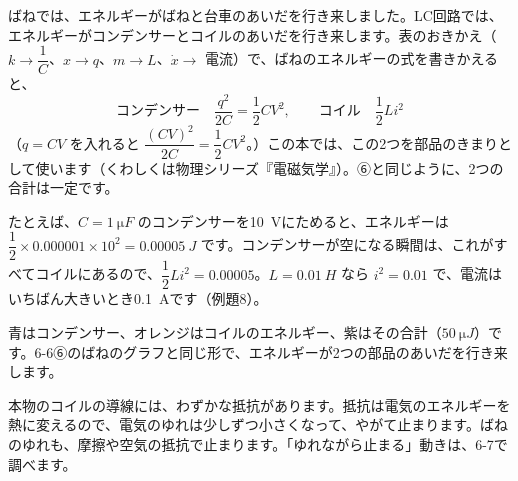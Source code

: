 ばねでは、エネルギーがばねと台車のあいだを行き来しました。LC回路では、エネルギーがコンデンサーとコイルのあいだを行き来します。表のおきかえ（$k\to\dfrac{1}{C}$、$x\to q$、$m\to L$、$\dot x\to$ 電流）で、ばねのエネルギーの式を書きかえると、
\[ \text{コンデンサー}\quad\frac{q^2}{2C}=\frac{1}{2}CV^2,\qquad \text{コイル}\quad\frac{1}{2}Li^2 \]
（$q=CV$ を入れると $\dfrac{(CV)^2}{2C}=\dfrac{1}{2}CV^2$。）この本では、この2つを部品のきまりとして使います（くわしくは物理シリーズ『電磁気学』）。⑥と同じように、2つの合計は一定です。

たとえば、$C=\qty{1}{\micro F}$ のコンデンサーを\qty{10}{V}にためると、エネルギーは $\dfrac{1}{2}\times0.000001\times10^2=\qty{0.00005}{J}$ です。コンデンサーが空になる瞬間は、これがすべてコイルにあるので、$\dfrac{1}{2}Li^2=0.00005$。$L=\qty{0.01}{H}$ なら $i^2=0.01$ で、電流はいちばん大きいとき\qty{0.1}{A}です（例題8）。

\noindent\begin{minipage}[c]{0.54\linewidth}
\end{minipage}\hfill
\begin{minipage}[c]{0.43\linewidth}
青はコンデンサー、オレンジはコイルのエネルギー、紫はその合計（$\qty{50}{\micro J}$）です。6-6⑥のばねのグラフと同じ形で、エネルギーが2つの部品のあいだを行き来します。
\end{minipage}

\begin{seikaku}
本物のコイルの導線には、わずかな抵抗があります。抵抗は電気のエネルギーを熱に変えるので、電気のゆれは少しずつ小さくなって、やがて止まります。ばねのゆれも、摩擦や空気の抵抗で止まります。「ゆれながら止まる」動きは、6-7で調べます。
\end{seikaku}

